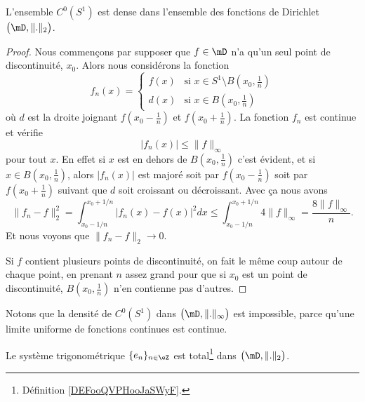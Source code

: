 \begin{lemma}   \label{LemVIwMsTC}
	L'ensemble \( C^0(S^1)\) est dense dans l'ensemble des fonctions de Dirichlet \( \big( \mD,\| . \|_2 \big)\).
\end{lemma}

\begin{proof}
	Nous commençons par supposer que \( f\in\mD\) n'a qu'un seul point de discontinuité, \( x_0\). Alors nous considérons la fonction
	\begin{equation}
		f_n(x)=\begin{cases}
			f(x) & \text{si } x\in S^1\setminus B(x_0,\frac{1}{ n }) \\
			d(x) & \text{si }x\in B(x_0,\frac{1}{ n })
		\end{cases}
	\end{equation}
	où \( d\) est la droite joignant \( f(x_0-\frac{1}{ n })\) et \( f(x_0+\frac{1}{ n })\). La fonction \( f_n\) est continue et vérifie
	\begin{equation}
		| f_n(x) |\leq \| f \|_{\infty}
	\end{equation}
	pour tout \( x\). En effet si \( x\) est en dehors de \( B(x_0,\frac{1}{ n })\) c'est évident, et si \( x\in B(x_0,\frac{1}{ n })\), alors \( | f_n(x) |\) est majoré soit par \( f(x_0-\frac{1}{ n })\) soit par \( f(x_0+\frac{1}{ n })\) suivant que \( d\) soit croissant ou décroissant. Avec ça nous avons
	\begin{equation}
		\| f_n-f \|_2^2=\int_{x_0-1/n}^{x_0+1/n}| f_n(x)-f(x) |^2dx\leq \int_{x_0-1/n}^{x_0+1/n}4\| f \|_{\infty}=\frac{ 8\| f \|_{\infty} }{ n }.
	\end{equation}
	Et nous voyons que \( \| f_n-f \|_2\to 0\).

	Si \( f\) contient plusieurs points de discontinuité, on fait le même coup autour de chaque point, en prenant \( n\) assez grand pour que si \( x_0\) est un point de discontinuité, \( B(x_0,\frac{1}{ n })\) n'en contienne pas d'autres.
\end{proof}

Notons que la densité de \( C^0(S^1)\) dans \( \big( \mD,\| . \|_{\infty} \big)\) est impossible, parce qu'une limite uniforme de fonctions continues est continue.

\begin{theorem}
	Le système trigonométrique \( \{ e_n \}_{n\in \eZ}\) est total\footnote{Définition \ref{DEFooQVPHooJaSWyF}.} dans \( \big( \mD,\| . \|_2 \big)\).
\end{theorem}

